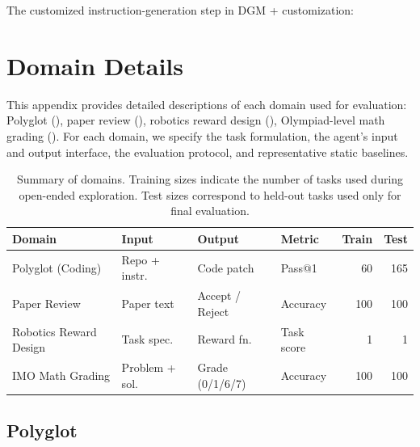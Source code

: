 \documentclass[]{fairmeta}
\begin{document}
The customized instruction-generation step in DGM + customization:


\section{Domain Details}
\label{app:domain-details}

This appendix provides detailed descriptions of each domain used for evaluation: Polyglot (), paper review (), robotics reward design (), Olympiad-level math grading (). For each domain, we specify the task formulation, the agent's input and output interface, the evaluation protocol, and representative static baselines.

\begin{table}[H]
\centering
\small
\setlength{\tabcolsep}{4pt}
\begin{tabular}{l l l l r r}
\toprule
\textbf{Domain} & \textbf{Input} & \textbf{Output} & \textbf{Metric} & \textbf{Train} & \textbf{Test} \\
\midrule
Polyglot (Coding) & Repo + instr. & Code patch & Pass@1 & 60 & 165 \\
Paper Review & Paper text & Accept / Reject & Accuracy & 100 & 100 \\
Robotics Reward Design & Task spec. & Reward fn. & Task score & 1 & 1 \\
IMO Math Grading & Problem + sol. & Grade (0/1/6/7) & Accuracy & 100 & 100 \\
\bottomrule
\end{tabular}
\caption{Summary of domains. Training sizes indicate the number of tasks used during open-ended exploration. Test sizes correspond to held-out tasks used only for final evaluation.}
\label{tab:domain-summary}
\end{table}

\subsection{Polyglot}
\label{app:domain-polyglot}
\end{document}
